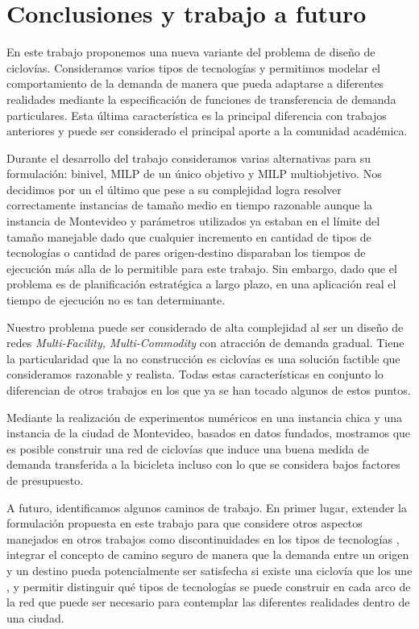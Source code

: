 \documentclass{article}
\begin{document}
  \section{Conclusiones y trabajo a futuro}

  En este trabajo proponemos una nueva variante del problema de diseño de ciclovías. Consideramos varios tipos de tecnologías y permitimos modelar el comportamiento de la demanda de manera que pueda adaptarse a diferentes realidades mediante la especificación de funciones de transferencia de demanda particulares. Esta última característica es la principal diferencia con trabajos anteriores y puede ser considerado el principal aporte a la comunidad académica.

  Durante el desarrollo del trabajo consideramos varias alternativas para su formulación: binivel, MILP de un único objetivo y MILP multiobjetivo. Nos decidimos por un el último que pese a su complejidad logra resolver correctamente instancias de tamaño medio en tiempo razonable aunque la instancia de Montevideo y parámetros utilizados ya estaban en el límite del tamaño manejable dado que cualquier incremento en cantidad de tipos de tecnologías o cantidad de pares origen-destino disparaban los tiempos de ejecución más alla de lo permitible para este trabajo. Sin embargo, dado que el problema es de planificación estratégica a largo plazo, en una aplicación real el tiempo de ejecución no es tan determinante.

  Nuestro problema puede ser considerado de alta complejidad al ser un diseño de redes {\it Multi-Facility, Multi-Commodity} con atracción de demanda gradual. Tiene la particularidad que la no construcción es ciclovías es una solución factible que consideramos razonable y realista. Todas estas características en conjunto lo diferencian de otros trabajos en los que ya se han tocado algunos de estos puntos.

  Mediante la realización de experimentos numéricos en una instancia chica y una instancia de la ciudad de Montevideo, basados en datos fundados, mostramos que es posible construir una red de ciclovías que induce una buena medida de demanda transferida a la bicicleta incluso con lo que se considera bajos factores de presupuesto.

  A futuro, identificamos algunos caminos de trabajo. En primer lugar, extender la formulación propuesta en este trabajo para que considere otros aspectos manejados en otros trabajos como discontinuidades en los tipos de tecnologías \cite{baya2021}, integrar el concepto de camino seguro de manera que la demanda entre un origen y un destino pueda potencialmente ser satisfecha si existe una ciclovía que los une \cite{Duthie2014}, y permitir distinguir qué tipos de tecnologías se puede construir en cada arco de la red que puede ser necesario para contemplar las diferentes realidades dentro de una ciudad.
\end{document}
